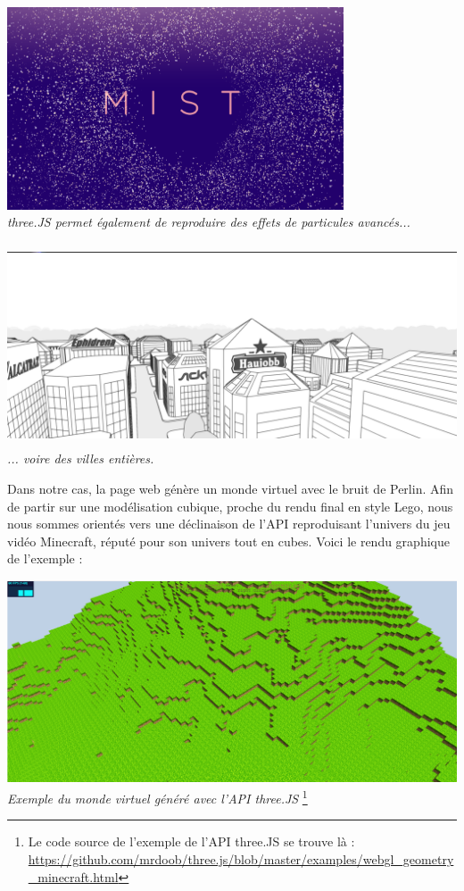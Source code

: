 \begin{center}
	\includegraphics[height=6cm]{images/threeJS_poly_particle.png}\\
	\textit{three.JS permet également de reproduire des effets de particules avancés...}
\end{center}

\begin{center}
	\includegraphics[height=6cm]{images/threeJS_poly_city.png}\\
	\textit{... voire des villes entières.}
\end{center}




Dans notre cas, la page web génère un monde virtuel avec le bruit de Perlin. Afin de partir sur une modélisation cubique, proche du rendu final en style Lego, nous nous sommes orientés vers une déclinaison de l'API reproduisant l'univers du jeu vidéo Minecraft, réputé pour son univers tout en cubes. Voici le rendu graphique de l'exemple :

\begin{center}
	\includegraphics[height=6cm]{images/threeJS_minecraft.png}\\
	\textit{Exemple du monde virtuel généré avec l'API three.JS}
	\footnote{Le code source de l'exemple de l'API three.JS se trouve là : \url{https://github.com/mrdoob/three.js/blob/master/examples/webgl_geometry_minecraft.html}}
\end{center}

